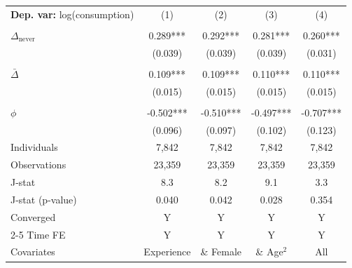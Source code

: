 \begin{tabular}{l cccc} \toprule  \textbf{Dep. var:}  log(consumption) 
                    &\multicolumn{1}{c}{(1)}   &\multicolumn{1}{c}{(2)}   &\multicolumn{1}{c}{(3)}   &\multicolumn{1}{c}{(4)}   \\
                    &               &               &               &               \\
\addlinespace
$\Delta_{\text{never}}$&       0.289***&       0.292***&       0.281***&       0.260***\\
                    &     (0.039)   &     (0.039)   &     (0.039)   &     (0.031)   \\
                    &               &               &               &               \\
\addlinespace
$\bar{\Delta}$      &       0.109***&       0.109***&       0.110***&       0.110***\\
                    &     (0.015)   &     (0.015)   &     (0.015)   &     (0.015)   \\
                    &               &               &               &               \\
\addlinespace
$\phi$              &      -0.502***&      -0.510***&      -0.497***&      -0.707***\\
                    &     (0.096)   &     (0.097)   &     (0.102)   &     (0.123)   \\
\addlinespace
Individuals         &       7,842   &       7,842   &       7,842   &       7,842   \\
Observations        &      23,359   &      23,359   &      23,359   &      23,359   \\
J-stat              &         8.3   &         8.2   &         9.1   &         3.3   \\
J-stat (p-value)    &       0.040   &       0.042   &       0.028   &       0.354   \\
Converged           &           Y   &           Y   &           Y   &           Y   \\
\cmidrule{2-5} Time FE & Y & Y & Y & Y \\ Covariates & Experience & \& Female & \& Age$^2$ & All \\ \bottomrule \end{tabular}
